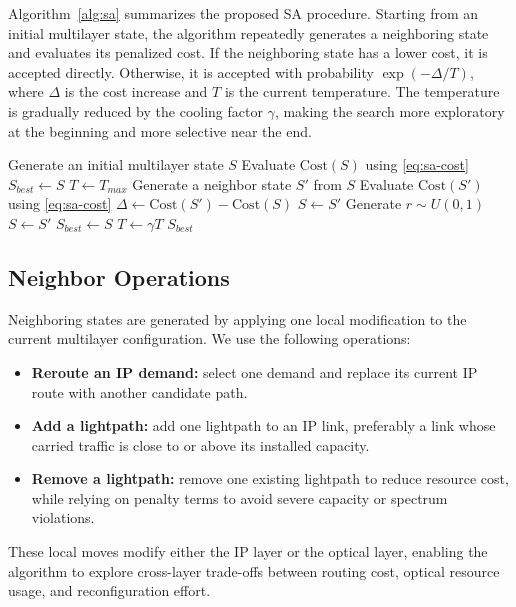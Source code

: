 \documentclass[conference]{IEEEtran}
\begin{document}
Algorithm~\ref{alg:sa} summarizes the proposed SA procedure. Starting from an initial multilayer state, the algorithm repeatedly generates a neighboring state and evaluates its penalized cost. If the neighboring state has a lower cost, it is accepted directly. Otherwise, it is accepted with probability $\exp(-\Delta/T)$, where $\Delta$ is the cost increase and $T$ is the current temperature. The temperature is gradually reduced by the cooling factor $\gamma$, making the search more exploratory at the beginning and more selective near the end.

\begin{algorithm}[t]
\caption{Penalty-Based Simulated Annealing for Cross-Layer Optimization}
\label{alg:sa}
\begin{algorithmic}[1]
\State Generate an initial multilayer state $S$
\State Evaluate $\mathrm{Cost}(S)$ using \eqref{eq:sa-cost}
\State $S_{best} \gets S$
\State $T \gets T_{max}$
        \State Generate a neighbor state $S'$ from $S$
        \State Evaluate $\mathrm{Cost}(S')$ using \eqref{eq:sa-cost}
        \State $\Delta \gets \mathrm{Cost}(S') - \mathrm{Cost}(S)$
            \State $S \gets S'$
        \Else
            \State Generate $r\sim U(0,1)$
                \State $S \gets S'$
            \EndIf
        \EndIf
            \State $S_{best} \gets S$
        \EndIf
    \EndFor
    \State $T \gets \gamma T$
\EndWhile
\State \Return $S_{best}$
\end{algorithmic}
\end{algorithm}

\subsection{Neighbor Operations}

Neighboring states are generated by applying one local modification to the current multilayer configuration. We use the following operations:
\begin{itemize}
    \item \textbf{Reroute an IP demand:} select one demand and replace its current IP route with another candidate path.
    \item \textbf{Add a lightpath:} add one lightpath to an IP link, preferably a link whose carried traffic is close to or above its installed capacity.
    \item \textbf{Remove a lightpath:} remove one existing lightpath to reduce resource cost, while relying on penalty terms to avoid severe capacity or spectrum violations.
\end{itemize}
These local moves modify either the IP layer or the optical layer, enabling the algorithm to explore cross-layer trade-offs between routing cost, optical resource usage, and reconfiguration effort.
\end{document}
